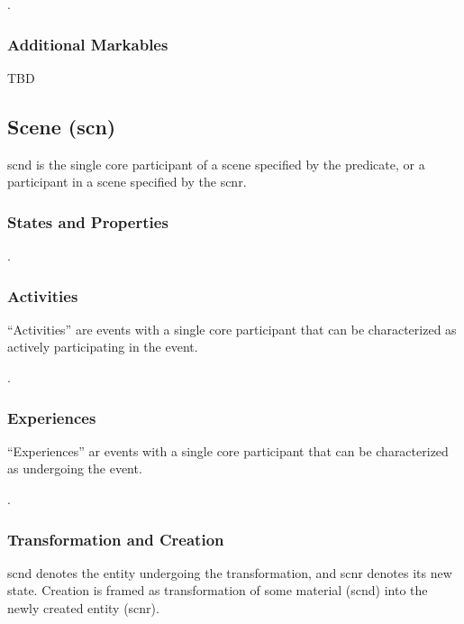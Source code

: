 \documentclass[a4paper]{article}
\begin{document}
\ex. 

\subsubsection{Additional Markables}

TBD

\subsection{Scene (\textsf{scn})}
\label{sec:scn}

\textsf{scnd} is the single core participant of a scene specified by the
predicate, or a participant in a scene specified by the \textsf{scnr}.

\subsubsection{States and Properties}

\ex. 

\subsubsection{Activities}

``Activities'' are events with a single core participant that can be
characterized as actively participating in the event.

\ex. 

\subsubsection{Experiences}

``Experiences'' ar events with a single core participant that can be
characterized as undergoing the event.

\ex. 

\subsubsection{Transformation and Creation}

\textsf{scnd} denotes the entity undergoing the transformation, and
\textsf{scnr} denotes its new state. Creation is framed as transformation of
some material (\textsf{scnd}) into the newly created entity (\textsf{scnr}).
\end{document}
